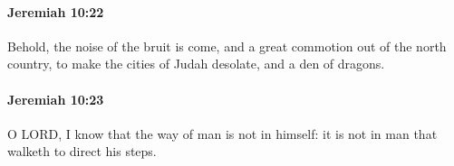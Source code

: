 		\paragraph{Jeremiah 10:22} %
			\label{JEREMIAH-10-22}

			Behold, the noise of the bruit is come, and a great commotion out of the north country, to make the cities of Judah desolate, and a den of dragons.


		\paragraph{Jeremiah 10:23} %
			\label{JEREMIAH-10-23}

			O LORD, I know that the way of man is not in himself: it is not in man that walketh to direct his steps.


